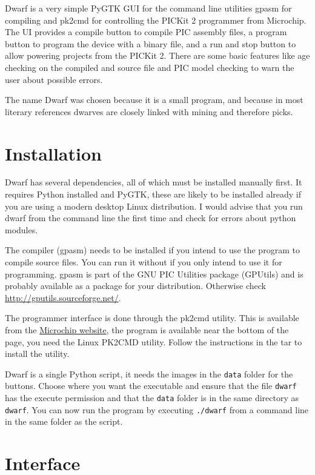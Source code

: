 \documentclass[a4paper,10pt]{article}
\begin{document}
Dwarf is a very simple PyGTK GUI for the command line utilities gpasm for compiling and pk2cmd for controlling the PICKit 2 programmer from Microchip.  The UI provides a compile button to compile PIC assembly files, a program button to program the device with a binary file, and a run and stop button to allow powering projects from the PICKit 2.  There are some basic features like age checking on the compiled and source file and PIC model checking to warn the user about possible errors.

The name Dwarf was chosen because it is a small program, and because in most literary references dwarves are closely linked with mining and therefore picks.

\section{Installation}
Dwarf has several dependencies, all of which must be installed manually first.  It requires Python installed and PyGTK, these are likely to be installed already if you are using a modern desktop Linux distribution.  I would advise that you run dwarf from the command line the first time and check for errors about python modules.

The compiler (gpasm) needs to be installed if you intend to use the program to compile source files.  You can run it without if you only intend to use it for programming.  gpasm is part of the GNU PIC Utilities package (GPUtils) and is probably available as a package for your distribution.  Otherwise check \href{http://gputils.sourceforge.net/}{http://gputils.sourceforge.net/}.

The programmer interface is done through the pk2cmd utility.  This is available from the \href{http://www.microchip.com/stellent/idcplg?IdcService=SS_GET_PAGE&nodeId=1406&dDocName=en023805&redirects=pickit2}{Microchip website}, the program is available near the bottom of the page, you need the Linux PK2CMD utility.  Follow the instructions in the tar to install the utility.

Dwarf is a single Python script, it needs the images in the \texttt{data} folder for the buttons.  Choose where you want the executable and ensure that the file \texttt{dwarf} has the execute permission and that the \texttt{data} folder is in the same directory as \texttt{dwarf}.  You can now run the program by executing \texttt{./dwarf} from a command line in the same folder as the script.

\section{Interface}
\end{document}
